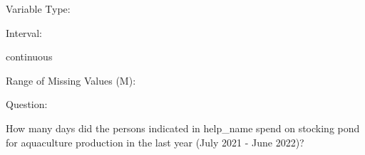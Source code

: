 \documentclass[
]{article}
\begin{document}
\begin{minipage}[t]{0.3\linewidth}

Variable Type:

\end{minipage}%
\begin{minipage}[t]{0.7\linewidth}

\end{minipage}

\begin{minipage}[t]{0.3\linewidth}

Interval:

\end{minipage}%
\begin{minipage}[t]{0.7\linewidth}

continuous

\end{minipage}

\begin{minipage}[t]{0.3\linewidth}

Range of Missing Values (M):

\end{minipage}%
\begin{minipage}[t]{0.7\linewidth}

\end{minipage}

\begin{minipage}[t]{0.3\linewidth}

Question:

\end{minipage}%
\begin{minipage}[t]{0.7\linewidth}

How many days did the persons indicated in help\_name spend on stocking
pond for aquaculture production in the last year (July 2021 - June
2022)?

\end{minipage}

\begin{minipage}[t]{0.3\linewidth}

~

\end{minipage}%
\begin{minipage}[t]{0.7\linewidth}

~

\end{minipage}
 \vspace*{-6mm} 

\begin{minipage}[t]{0.3\linewidth}

~

\end{minipage}%
\begin{minipage}[t]{0.7\linewidth}

~

\end{minipage}
 \vspace*{-4mm} 
\end{document}
